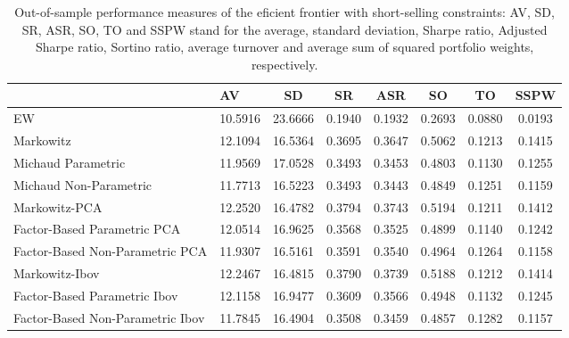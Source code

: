 \begin{table}

\caption{\label{tab:empirical_ef_2}Out-of-sample performance measures of the eficient frontier with short-selling constraints: AV, SD, SR, ASR, SO, TO and SSPW stand for the average, standard deviation, Sharpe ratio, Adjusted Sharpe ratio, Sortino ratio, average turnover and average sum of squared portfolio weights, respectively.}
\centering
\begin{tabular}[t]{l|l|c|c|c|c|c|c}
\hline
  & AV & SD & SR & ASR & SO & TO & SSPW\\
\hline
EW & 10.5916 & 23.6666 & 0.1940 & 0.1932 & 0.2693 & 0.0880 & 0.0193\\
\hline
Markowitz & 12.1094 & 16.5364 & 0.3695 & 0.3647 & 0.5062 & 0.1213 & 0.1415\\
\hline
Michaud Parametric & 11.9569 & 17.0528 & 0.3493 & 0.3453 & 0.4803 & 0.1130 & 0.1255\\
\hline
Michaud Non-Parametric & 11.7713 & 16.5223 & 0.3493 & 0.3443 & 0.4849 & 0.1251 & 0.1159\\
\hline
Markowitz-PCA & 12.2520 & 16.4782 & 0.3794 & 0.3743 & 0.5194 & 0.1211 & 0.1412\\
\hline
Factor-Based Parametric PCA & 12.0514 & 16.9625 & 0.3568 & 0.3525 & 0.4899 & 0.1140 & 0.1242\\
\hline
Factor-Based Non-Parametric PCA & 11.9307 & 16.5161 & 0.3591 & 0.3540 & 0.4964 & 0.1264 & 0.1158\\
\hline
Markowitz-Ibov & 12.2467 & 16.4815 & 0.3790 & 0.3739 & 0.5188 & 0.1212 & 0.1414\\
\hline
Factor-Based Parametric Ibov & 12.1158 & 16.9477 & 0.3609 & 0.3566 & 0.4948 & 0.1132 & 0.1245\\
\hline
Factor-Based Non-Parametric Ibov & 11.7845 & 16.4904 & 0.3508 & 0.3459 & 0.4857 & 0.1282 & 0.1157\\
\hline
\end{tabular}
\end{table}
